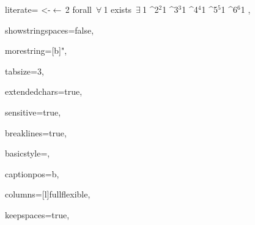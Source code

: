 {%
 literate=
	{<-}{{$\leftarrow\,$}}2
	{forall\ }{{$\forall\ \!$}}1
	{exists\ }{{$\exists\ \!$}}1
	{^2}{{$^2$}}1
	{^3}{{$^3$}}1
	{^4}{{$^4$}}1
	{^5}{{$^5$}}1
	{^6}{{$^6$}}1
,


showstringspaces=false,

morestring=[b]",

tabsize=3,

extendedchars=true,

sensitive=true,

breaklines=true,

basicstyle=\ttfamily\footnotesize,

captionpos=b,

columns=[l]fullflexible,

keepspaces=true,

}
